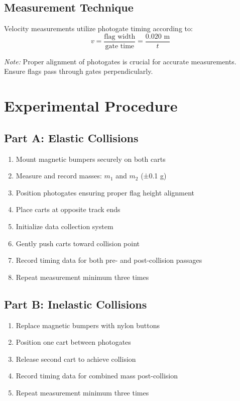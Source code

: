 \documentclass[12pt]{article}
\newcommand{\note}[1]{
    \begin{mdframed}[linecolor=gray!50]
        \textit{Note:} #1
    \end{mdframed}
}
\begin{document}
\subsection{Measurement Technique}
Velocity measurements utilize photogate timing according to:
\begin{equation}
    v = \frac{\text{flag width}}{\text{gate time}} = \frac{0.020 \text{ m}}{t}
\end{equation}

\note{Proper alignment of photogates is crucial for accurate measurements. Ensure flags pass through gates perpendicularly.}

\section{Experimental Procedure}

\subsection{Part A: Elastic Collisions}
\begin{enumerate}
    \item Mount magnetic bumpers securely on both carts
    \item Measure and record masses: $m_1$ and $m_2$ (±0.1 g)
    \item Position photogates ensuring proper flag height alignment
    \item Place carts at opposite track ends
    \item Initialize data collection system
    \item Gently push carts toward collision point
    \item Record timing data for both pre- and post-collision passages
    \item Repeat measurement minimum three times
\end{enumerate}

\subsection{Part B: Inelastic Collisions}
\begin{enumerate}
    \item Replace magnetic bumpers with nylon buttons
    \item Position one cart between photogates
    \item Release second cart to achieve collision
    \item Record timing data for combined mass post-collision
    \item Repeat measurement minimum three times
\end{enumerate}
\end{document}
